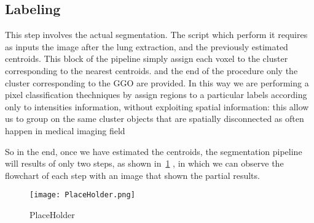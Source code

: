 \documentclass{standalone}
\begin{document}
	\subsection*{Labeling}
	
	This step involves the actual segmentation. The script which perform it requires as inputs the image after the lung extraction, and the previously estimated centroids. This block of the pipeline simply assign each voxel to the cluster corresponding to the nearest centroids. and the end of the procedure only the cluster corresponding to the GGO are provided. In this way we are performing a pixel classification thechniques by assign regions to a particular labels according only to intensities information, without exploiting spatial information: this allow us to group on the same cluster objects that are spatially disconnected as often happen in medical imaging field
	
	So in the end, once we have estimated the centroids, the segmentation pipeline will results of only two steps, as shown in \figurename\,\ref{fig:FinalPipeline} , in which we can observe the flowchart of each step with an image that shown the partial results.
	
	
	\begin{figure}\label{fig:FinalPipeline}
		\centering
			\texttt{[image: PlaceHolder.png]}
			\caption{PlaceHolder}
	\end{figure}
	
	
	
\end{document}
